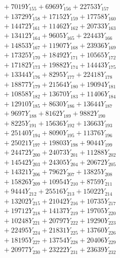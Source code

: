 \documentclass[a4paper,10pt]{article}
\begin{document}
{\begin{align}
&\;  + 7019 Y_{155} + 6969 Y_{156} + 22753 Y_{157} \\[0.3ex]
&\;  + 13729 Y_{158} + 17152 Y_{159} + 17758 Y_{160} \\[0.3ex]
&\;  + 14472 Y_{161} + 11462 Y_{162} + 20733 Y_{163} \\[0.3ex]
&\;  + 13412 Y_{164} + 9605 Y_{165} + 22443 Y_{166} \\[0.3ex]
&\;  + 14853 Y_{167} + 11907 Y_{168} + 23936 Y_{169} \\[0.3ex]
&\;  + 17325 Y_{170} + 18492 Y_{171} + 10565 Y_{172} \\[0.3ex]
&\;  + 17182 Y_{173} + 19882 Y_{174} + 14443 Y_{175} \\[0.3ex]
&\;  + 13344 Y_{176} + 8295 Y_{177} + 22418 Y_{178} \\[0.5ex]\allowbreak
&\;  + 18877 Y_{179} + 21564 Y_{180} + 19094 Y_{181} \\[0.3ex]
&\;  + 10858 Y_{182} + 13670 Y_{183} + 11406 Y_{184} \\[0.3ex]
&\;  + 12910 Y_{185} + 8630 Y_{186} + 13644 Y_{187} \\[0.3ex]
&\;  + 9697 Y_{188} + 8162 Y_{189} + 9882 Y_{190} \\[0.3ex]
&\;  + 8225 Y_{191} + 15636 Y_{192} + 13663 Y_{193} \\[0.3ex]
&\;  + 25140 Y_{194} + 8090 Y_{195} + 11376 Y_{196} \\[0.3ex]
&\;  + 25021 Y_{197} + 19803 Y_{198} + 9044 Y_{199} \\[0.3ex]
&\;  + 24472 Y_{200} + 24073 Y_{201} + 11288 Y_{202} \\[0.3ex]
&\;  + 14542 Y_{203} + 24305 Y_{204} + 20672 Y_{205} \\[0.3ex]
&\;  + 14321 Y_{206} + 7962 Y_{207} + 13825 Y_{208} \\[0.5ex]\allowbreak
&\;  + 15826 Y_{209} + 10954 Y_{210} + 8759 Y_{211} \\[0.3ex]
&\;  + 9444 Y_{212} + 25516 Y_{213} + 15022 Y_{214} \\[0.3ex]
&\;  + 13202 Y_{215} + 21042 Y_{216} + 10735 Y_{217} \\[0.3ex]
&\;  + 19712 Y_{218} + 14137 Y_{219} + 19705 Y_{220} \\[0.3ex]
&\;  + 10248 Y_{221} + 20797 Y_{222} + 19290 Y_{223} \\[0.3ex]
&\;  + 22495 Y_{224} + 21831 Y_{225} + 13760 Y_{226} \\[0.3ex]
&\;  + 18195 Y_{227} + 13754 Y_{228} + 20406 Y_{229} \\[0.3ex]
&\;  + 20977 Y_{230} + 23222 Y_{231} + 23639 Y_{232} \\[0.3ex]

\end{align}}
\end{document}
